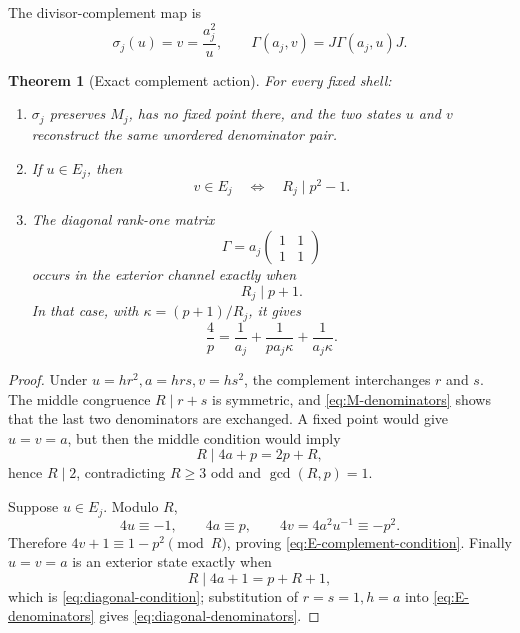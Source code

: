 \documentclass[11pt]{article}
\newtheorem{theorem}{Theorem}[section]
\theoremstyle{definition}
\theoremstyle{remark}
\begin{document}
The divisor-complement map is
\begin{equation}\label{eq:divisor-complement}
 \sigma_j(u)=v=\frac{a_j^2}{u},
 \qquad
 \Gamma(a_j,v)=J\Gamma(a_j,u)J.
\end{equation}

\begin{theorem}[Exact complement action]
\label{thm:complement-action}
For every fixed shell:
\begin{enumerate}[label=(\roman*)]
\item \(\sigma_j\) preserves \(M_j\), has no fixed point there, and the two
states \(u\) and \(v\) reconstruct the same unordered denominator pair.
\item If \(u\in E_j\), then
\begin{equation}\label{eq:E-complement-condition}
 v\in E_j
 \quad\Longleftrightarrow\quad
 R_j\mid p^2-1.
\end{equation}
\item The diagonal rank-one matrix
\begin{equation}\label{eq:diagonal-gamma}
 \Gamma=a_j\begin{pmatrix}1&1\\1&1\end{pmatrix}
\end{equation}
occurs in the exterior channel exactly when
\begin{equation}\label{eq:diagonal-condition}
 R_j\mid p+1.
\end{equation}
In that case, with \(\kappa=(p+1)/R_j\), it gives
\begin{equation}\label{eq:diagonal-denominators}
 \frac4p=\frac1{a_j}+\frac1{pa_j\kappa}
             +\frac1{a_j\kappa}.
\end{equation}
\end{enumerate}
\end{theorem}

\begin{proof}
Under \(u=hr^2,a=hrs,v=hs^2\), the complement interchanges \(r\) and
\(s\).  The middle congruence \(R\mid r+s\) is symmetric, and
\eqref{eq:M-denominators} shows that the last two denominators are exchanged.
A fixed point would give \(u=v=a\), but then the middle condition would imply
\[
 R\mid4a+p=2p+R,
\]
hence \(R\mid2\), contradicting \(R\ge3\) odd and \(\gcd(R,p)=1\).

Suppose \(u\in E_j\).  Modulo \(R\),
\[
 4u\equiv-1,
 \qquad 4a\equiv p,
 \qquad
 4v=4a^2u^{-1}\equiv-p^2.
\]
Therefore \(4v+1\equiv1-p^2\pmod R\), proving
\eqref{eq:E-complement-condition}.  Finally \(u=v=a\) is an exterior state
exactly when
\[
 R\mid4a+1=p+R+1,
\]
which is \eqref{eq:diagonal-condition}; substitution of \(r=s=1,h=a\) into
\eqref{eq:E-denominators} gives \eqref{eq:diagonal-denominators}.
\end{proof}
\end{document}
